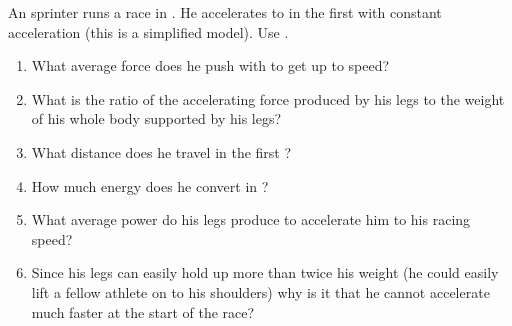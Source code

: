 
\begin{problem}[Robin5]
{An  sprinter runs a  race in . He accelerates to  in the first  with constant acceleration (this is a simplified model). Use .
\begin{enumerate}
	\item What average force does he push with to get up to speed?
	\item What is the ratio of the accelerating force produced by his
legs to the weight of his whole body supported by his legs? 
	\item What distance does he travel in the first ?
	\item How much energy does he convert in ?
	\item What average power do his legs produce to accelerate him to his racing speed?
	\item Since his legs can easily hold up more than twice his weight (he could easily lift a fellow athlete on to his shoulders) why is it that he cannot accelerate much faster at the start of the race?
\end{enumerate}
}
{}
{}
\end{problem}